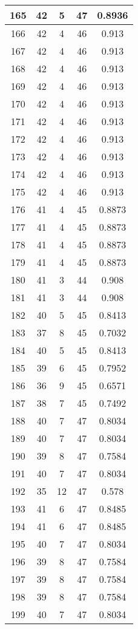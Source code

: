 \documentclass[letterpaper, 12pt]{article}
\begin{document}
\begin{longtable}{|c|c|c|c|c|}
\hline
165 & 42 & 5 & 47 & 0.8936 \\
\hline
166 & 42 & 4 & 46 & 0.913 \\
\hline
167 & 42 & 4 & 46 & 0.913 \\
\hline
168 & 42 & 4 & 46 & 0.913 \\
\hline
169 & 42 & 4 & 46 & 0.913 \\
\hline
170 & 42 & 4 & 46 & 0.913 \\
\hline
171 & 42 & 4 & 46 & 0.913 \\
\hline
172 & 42 & 4 & 46 & 0.913 \\
\hline
173 & 42 & 4 & 46 & 0.913 \\
\hline
174 & 42 & 4 & 46 & 0.913 \\
\hline
175 & 42 & 4 & 46 & 0.913 \\
\hline
176 & 41 & 4 & 45 & 0.8873 \\
\hline
177 & 41 & 4 & 45 & 0.8873 \\
\hline
178 & 41 & 4 & 45 & 0.8873 \\
\hline
179 & 41 & 4 & 45 & 0.8873 \\
\hline
180 & 41 & 3 & 44 & 0.908 \\
\hline
181 & 41 & 3 & 44 & 0.908 \\
\hline
182 & 40 & 5 & 45 & 0.8413 \\
\hline
183 & 37 & 8 & 45 & 0.7032 \\
\hline
184 & 40 & 5 & 45 & 0.8413 \\
\hline
185 & 39 & 6 & 45 & 0.7952 \\
\hline
186 & 36 & 9 & 45 & 0.6571 \\
\hline
187 & 38 & 7 & 45 & 0.7492 \\
\hline
188 & 40 & 7 & 47 & 0.8034 \\
\hline
189 & 40 & 7 & 47 & 0.8034 \\
\hline
190 & 39 & 8 & 47 & 0.7584 \\
\hline
191 & 40 & 7 & 47 & 0.8034 \\
\hline
192 & 35 & 12 & 47 & 0.578 \\
\hline
193 & 41 & 6 & 47 & 0.8485 \\
\hline
194 & 41 & 6 & 47 & 0.8485 \\
\hline
195 & 40 & 7 & 47 & 0.8034 \\
\hline
196 & 39 & 8 & 47 & 0.7584 \\
\hline
197 & 39 & 8 & 47 & 0.7584 \\
\hline
198 & 39 & 8 & 47 & 0.7584 \\
\hline
199 & 40 & 7 & 47 & 0.8034 \\
\hline
\end{longtable}
\end{document}
